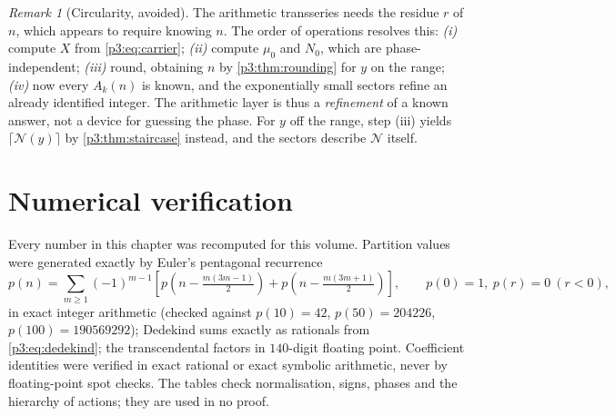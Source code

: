 \documentclass[11pt,a4paper,oneside]{book}
\theoremstyle{plain}
\theoremstyle{definition}
\theoremstyle{remark}
\newtheorem{remark}[theorem]{Remark}
\begin{document}
\begin{remark}[Circularity, avoided]\label{p3:rem:no-circularity}
The arithmetic transseries needs the residue $r$ of $n$, which appears to require knowing $n$. The
order of operations resolves this: \emph{(i)} compute $X$ from \cref{p3:eq:carrier}; \emph{(ii)}
compute $\mu_{0}$ and $N_{0}$, which are phase-independent; \emph{(iii)} round, obtaining $n$ by
\cref{p3:thm:rounding} for $y$ on the range; \emph{(iv)} now every $A_{k}(n)$ is known, and the
exponentially small sectors refine an already identified integer. The arithmetic layer is thus a
\emph{refinement} of a known answer, not a device for guessing the phase. For $y$ off the range,
step (iii) yields $\lceil\mathcal{N}(y)\rceil$ by \cref{p3:thm:staircase} instead, and the sectors
describe $\mathcal{N}$ itself.
\end{remark}

\section{Numerical verification}\label{p3:sub:numerics}

Every number in this chapter was recomputed for this volume. Partition values were generated
exactly by Euler's pentagonal recurrence
\begin{equation}\label{p3:eq:pentagonal}
 p(n)=\sum_{m\ge1}(-1)^{m-1}
 \left[p\!\left(n-\tfrac{m(3m-1)}2\right)+p\!\left(n-\tfrac{m(3m+1)}2\right)\right],
 \qquad p(0)=1,\ p(r)=0\ (r<0),
\end{equation}
in exact integer arithmetic (checked against $p(10)=42$, $p(50)=204226$, $p(100)=190569292$);
Dedekind sums exactly as rationals from \cref{p3:eq:dedekind}; the transcendental factors in
$140$-digit floating point. Coefficient identities were verified in exact rational or exact
symbolic arithmetic, never by floating-point spot checks. The tables check normalisation, signs,
phases and the hierarchy of actions; they are used in no proof.
\end{document}
